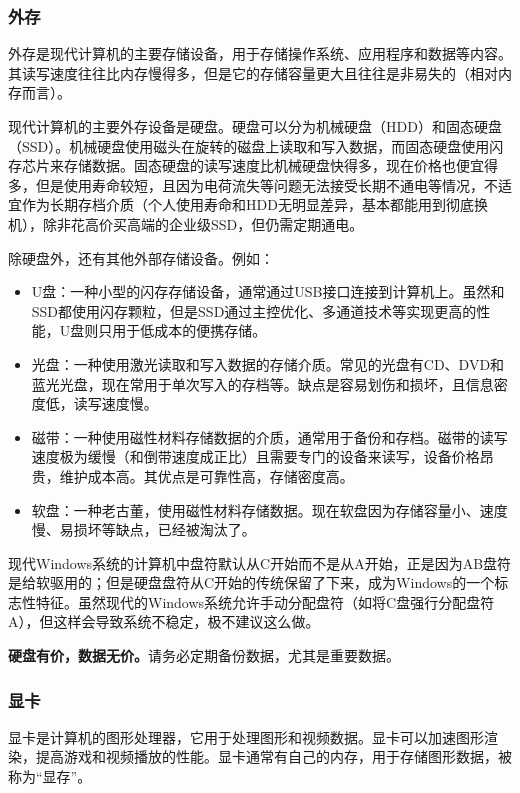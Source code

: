 \documentclass[../main.tex]{subfiles}
\begin{document}
\subsubsection{外存}

外存是现代计算机的主要存储设备，用于存储操作系统、应用程序和数据等内容。其读写速度往往比内存慢得多，但是它的存储容量更大且往往是非易失的（相对内存而言）。

现代计算机的主要外存设备是硬盘。硬盘可以分为机械硬盘（HDD）和固态硬盘（SSD）。机械硬盘使用磁头在旋转的磁盘上读取和写入数据，而固态硬盘使用闪存芯片来存储数据。固态硬盘的读写速度比机械硬盘快得多，现在价格也便宜得多，但是使用寿命较短，且因为电荷流失等问题无法接受长期不通电等情况，不适宜作为长期存档介质（个人使用寿命和HDD无明显差异，基本都能用到彻底换机），除非花高价买高端的企业级SSD，但仍需定期通电。

除硬盘外，还有其他外部存储设备。例如：
\begin{itemize}
  \item U盘：一种小型的闪存存储设备，通常通过USB接口连接到计算机上。虽然和SSD都使用闪存颗粒，但是SSD通过主控优化、多通道技术等实现更高的性能，U盘则只用于低成本的便携存储。
  \item 光盘：一种使用激光读取和写入数据的存储介质。常见的光盘有CD、DVD和蓝光光盘，现在常用于单次写入的存档等。缺点是容易划伤和损坏，且信息密度低，读写速度慢。
  \item 磁带：一种使用磁性材料存储数据的介质，通常用于备份和存档。磁带的读写速度极为缓慢（和倒带速度成正比）且需要专门的设备来读写，设备价格昂贵，维护成本高。其优点是可靠性高，存储密度高。
  \item 软盘：一种老古董，使用磁性材料存储数据。现在软盘因为存储容量小、速度慢、易损坏等缺点，已经被淘汰了。
\end{itemize}

\begin{tcolorbox}[title=说明]
  现代Windows系统的计算机中盘符默认从C开始而不是从A开始，正是因为AB盘符是给软驱用的；但是硬盘盘符从C开始的传统保留了下来，成为Windows的一个标志性特征。虽然现代的Windows系统允许手动分配盘符（如将C盘强行分配盘符A），但这样会导致系统不稳定，极不建议这么做。
\end{tcolorbox}

\textbf{硬盘有价，数据无价。}请务必定期备份数据，尤其是重要数据。

\subsubsection{显卡}

显卡是计算机的图形处理器，它用于处理图形和视频数据。显卡可以加速图形渲染，提高游戏和视频播放的性能。显卡通常有自己的内存，用于存储图形数据，被称为“显存”。
\end{document}
